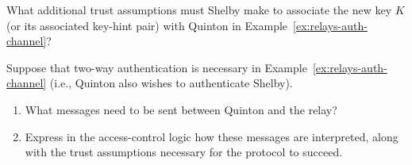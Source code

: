 \begin{exercise}[\appn]
  What additional trust assumptions must Shelby make to associate the
  new key $K$ (or its associated key-hint pair) with Quinton in
  Example~\ref{ex:relays-auth-channel}? 
\end{exercise}

\begin{exercise}[\synthesis]
  Suppose that two-way authentication is necessary in
  Example~\ref{ex:relays-auth-channel} (i.e., Quinton also wishes to
  authenticate Shelby).
  \begin{enumerate}
  \item What messages need to be sent between Quinton and the relay?
  \item Express in the access-control logic how these messages are
    interpreted, along with the trust assumptions necessary for the
    protocol to succeed.
  \end{enumerate}
\end{exercise}



